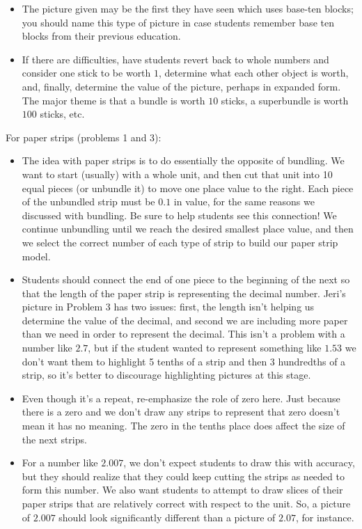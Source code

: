 \documentclass[nooutcomes,noauthor,handout]{ximera}
\begin{document}
\begin{instructorNotes}
\begin{itemize}
	\item The picture given may be the first they have seen which uses base-ten blocks; you should name this type of picture in case students remember base ten blocks from their previous education.
	\item If there are difficulties, have students revert back to whole numbers and consider one stick to be worth $1$, determine what each other object is worth, and, finally, determine the value of the picture, perhaps in expanded form.  The major theme is that a bundle is worth $10$ sticks, a superbundle is worth $100$ sticks, etc.
    \end{itemize}

For paper strips (problems 1 and 3):
\begin{itemize}
	\item The idea with paper strips is to do essentially the opposite of bundling. We want to start (usually) with a whole unit, and then cut that unit into 10 equal pieces (or unbundle it) to move one place value to the right. Each piece of the unbundled strip must be $0.1$ in value, for the same reasons we discussed with bundling. Be sure to help students see this connection! We continue unbundling until we reach the desired smallest place value, and then we select the correct number of each type of strip to build our paper strip model. 
	\item Students should connect the end of one piece to the beginning of the next so that the length of the paper strip is representing the decimal number. Jeri's picture in Problem 3 has two issues: first, the length isn't helping us determine the value of the decimal, and second we are including more paper than we need in order to represent the decimal. This isn't a problem with a number like $2.7$, but if the student wanted to represent something like $1.53$ we don't want them to highlight 5 tenths of a strip and then 3 hundredths of a strip, so it's better to discourage highlighting pictures at this stage.
	\item Even though it's a repeat, re-emphasize the role of zero here. Just because there is a zero and we don't draw any strips to represent that zero doesn't mean it has no meaning. The zero in the tenths place does affect the size of the next strips.
	\item For a number like $2.007$, we don't expect students to draw this with accuracy, but they should realize that they could keep cutting the strips as needed to form this number. We also want students to attempt to draw slices of their paper strips that are relatively correct with respect to the unit. So, a picture of $2.007$ should look significantly different than a picture of $2.07$, for instance.
\end{itemize}


\end{instructorNotes}
\end{document}
